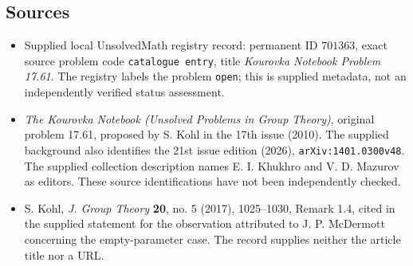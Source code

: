\documentclass[11pt]{article}
\begin{document}
\subsection{Sources}
\begin{itemize}
\item Supplied local UnsolvedMath registry record: permanent ID \(701363\), exact source problem code \texttt{catalogue entry}, title \emph{Kourovka Notebook Problem 17.61}. The registry labels the problem \texttt{open}; this is supplied metadata, not an independently verified status assessment.
\item \emph{The Kourovka Notebook (Unsolved Problems in Group Theory)}, original problem 17.61, proposed by S. Kohl in the 17th issue (2010). The supplied background also identifies the 21st issue edition (2026), \texttt{arXiv:1401.0300v48}. The supplied collection description names E. I. Khukhro and V. D. Mazurov as editors. These source identifications have not been independently checked.
\item S. Kohl, \emph{J. Group Theory} \textbf{20}, no. 5 (2017), 1025--1030, Remark 1.4, cited in the supplied statement for the observation attributed to J. P. McDermott concerning the empty-parameter case. The record supplies neither the article title nor a URL.
\end{itemize}
\end{document}
